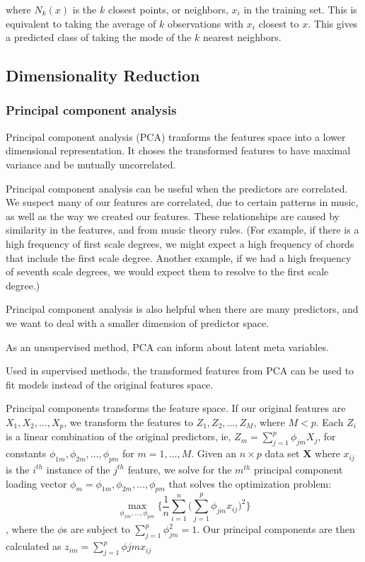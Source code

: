 \documentclass[12pt,twoside]{reedthesis}
\theoremstyle{definition}
\theoremstyle{definition}
\theoremstyle{definition}
\theoremstyle{remark}
\begin{document}
where \(N_k(x)\) is the \(k\) closest points, or neighbors, \(x_i\) in
the training set. This is equivalent to taking the average of \(k\)
observations with \(x_i\) closest to \(x\). This gives a predicted class
of taking the mode of the \(k\) nearest neighbors.

\subsection{Dimensionality Reduction}\label{dimensionality-reduction}

\subsubsection{Principal component
analysis}\label{principal-component-analysis}

Principal component analysis (PCA) tranforms the features space into a
lower dimensional representation. It choses the transformed features to
have maximal variance and be mutually uncorrelated.

Principal component analysis can be useful when the predictors are
correlated. We suspect many of our features are correlated, due to
certain patterns in music, as well as the way we created our features.
These relationships are caused by similarity in the features, and from
music theory rules. (For example, if there is a high frequency of first
scale degrees, we might expect a high frequency of chords that include
the first scale degree. Another example, if we had a high frequency of
seventh scale degrees, we would expect them to resolve to the first
scale degree.)

Principal component analysis is also helpful when there are many
predictors, and we want to deal with a smaller dimension of predictor
space.

As an unsupervised method, PCA can inform about latent meta variables.

Used in supervised methods, the transformed features from PCA can be
used to fit models instead of the original features space.

Principal components transforms the feature space. If our original
features are \(X_1,X_2,\ldots,X_p\), we transform the features to
\(Z_1,Z_2,\ldots,Z_M\), where \(M < p\). Each \(Z_i\) is a linear
combination of the original predictors, ie,
\(Z_m = \sum_{j = 1}^p \phi_{jm}X_j\), for constants
\(\phi_{1m},\phi_{2m},\ldots,\phi_{pm}\) for \(m = 1,\ldots,M\). Given
an \(n\times p\) data set \(\mathbf{X}\) where \(x_{ij}\) is the
\(i^{th}\) instance of the \(j^{th}\) feature, we solve for the
\(m^{th}\) principal component loading vector
\(\phi_m = \phi_{1m},\phi_{2m},\ldots,\phi_{pm}\) that solves the
optimization problem:
\[\max_{\phi_{1m},\ldots,\phi_{pm}} \bigg\{\frac{1}{n}\sum_{i=1}^n\bigg(\sum_{j=1}^p \phi_{jm}x_{ij}\bigg)^2\bigg\}\],
where the \(\phi\)s are subject to \(\sum_{j = 1}^p\phi_{jm}^2 = 1\).
Our principal components are then calculated as
\(z_{im} = \sum_{j = 1}^p\phi{jm}x_{ij}\)
\end{document}
